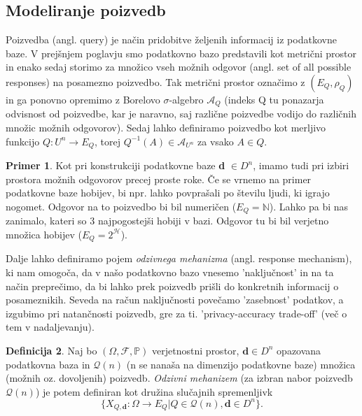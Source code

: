 \documentclass[12pt,a4paper]{amsart}
\theoremstyle{definition} %
\newtheorem{definicija}{Definicija}[section]
\newtheorem{primer}[definicija]{Primer}
\theoremstyle{plain} %
\begin{document}
\subsection{Modeliranje poizvedb}
Poizvedba (angl. query) je način pridobitve željenih informacij iz podatkovne baze. V prejšnjem poglavju smo podatkovno bazo predstavili kot metrični prostor in enako sedaj storimo za množico vseh možnih odgovor (angl. set of all possible responses) na posamezno poizvedbo. Tak metrični prostor označimo z $(E_{Q}, \rho_{Q})$ in ga ponovno opremimo z Borelovo $\sigma$-algebro $\mathcal{A}_{Q}$ (indeks Q tu ponazarja odvisnost od poizvedbe, kar je naravno, saj različne poizvedbe vodijo do različnih množic možnih odgovorov). Sedaj lahko definiramo poizvedbo kot merljivo funkcijo $Q: U^n \rightarrow E_{Q} $, torej $Q^{-1}(A) \in \mathcal{A}_{U^n}$ za vsako $A \in Q$.
\begin{primer} Kot pri konstrukciji podatkovne baze \textbf{d} $\in D^n$, imamo tudi pri izbiri prostora možnih odgovorov precej proste roke. Če se vrnemo na primer podatkovne baze hobijev, bi npr. lahko povprašali po številu ljudi, ki igrajo nogomet. Odgovor na to poizvedbo bi bil numeričen ($E_{Q} = \mathbb{N}$). Lahko pa bi nas zanimalo, kateri so 3 najpogostejši hobiji v bazi. Odgovor tu bi bil verjetno množica hobijev  ($E_{Q} = 2^\mathcal{H}$).
\end{primer}
\newline
\newline
Dalje lahko definiramo pojem \textit{odzivnega mehanizma} (angl. response mechanism), ki nam omogoča, da v našo podatkovno bazo vnesemo 'naključnost' in na ta način preprečimo, da bi lahko prek poizvedb prišli do konkretnih informacij o posameznikih. Seveda na račun naključnosti povečamo 'zasebnost' podatkov, a izgubimo pri natančnosti poizvedb, gre za ti. 'privacy-accuracy trade-off' (več o tem v nadaljevanju). 
\begin{definicija}
Naj bo $(\Omega , \mathcal{F}, \mathbb {P} )$ verjetnostni prostor, $\textbf{d}\in D^n$ opazovana podatkovna baza in $\mathcal{Q}(n)$ (n se nanaša na dimenzijo podatkovne baze) množica (možnih oz. dovoljenih) poizvedb. \textit{Odzivni mehanizem} (za izbran nabor poizvedb $\mathcal{Q}(n)$) je potem definiran kot družina slučajnih spremenljivk
\begin{equation}\label{odzivni}
 \{X_{Q,\textbf{d}} : \Omega \rightarrow  E_{Q} | Q \in  \mathcal{Q} (n), \textbf{d} \in D^n\} \tag{1}.
\end{equation} 
\end{definicija}
\end{document}
